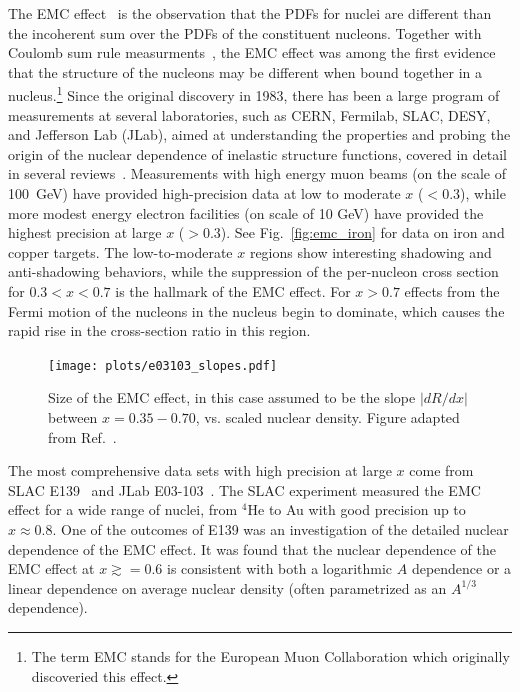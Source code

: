 The EMC effect~\cite{Aubert:1983xm} is the observation that the PDFs for nuclei are different than the incoherent sum over the PDFs of the constituent nucleons. Together with Coulomb sum rule measurments~\cite{Altemus:1980wt,Noble:1980my,Meziani:1984is,Morgenstern:2001jt,Cloet:2015tha}, the EMC effect was among the first evidence that the structure of the nucleons may be different when bound together in a nucleus.\footnote{The term EMC stands for the European Muon Collaboration which originally discoveried this effect.} Since the original discovery in 1983, there has been a large program of measurements at several laboratories, such as CERN, Fermilab, SLAC, DESY, and Jefferson Lab (JLab), aimed at understanding the properties and probing the origin of the nuclear dependence of inelastic structure functions, covered in detail in several reviews~\cite{Frankfurt:1988nt,Arneodo:1992wf,Geesaman:1995yd,Piller:1999wx,Sargsian:2002wc,Malace:2014uea,Hen:2016kwk}. Measurements with high energy muon beams (on the scale of 100~GeV) have provided high-precision data at low to moderate $x$ ($<0.3$), while more modest energy electron facilities (on scale of 10 GeV) have provided the highest precision at large $x$ ($>0.3$). See  Fig.~\ref{fig:emc_iron} for data on iron and copper targets.  The low-to-moderate $x$ regions show interesting shadowing and anti-shadowing behaviors, while the suppression of the per-nucleon cross section for $0.3<x<0.7$ is the hallmark of the EMC effect. For $x > 0.7$ effects from the Fermi motion of the nucleons in the nucleus begin to dominate, which causes the rapid rise in the cross-section ratio in this region.

\begin{figure}[tbp]
\centering\texttt{[image: plots/e03103\_slopes.pdf]}
\caption{Size of the EMC effect, in this case assumed to be the slope $|dR/dx|$ between $x=0.35-0.70$, vs. scaled nuclear density. Figure adapted from Ref.~\cite{Seely:2009gt}.}
\label{fig:emc_jlab_hallc}
\end{figure}

The most comprehensive data sets with high precision at large $x$ come from SLAC E139~\cite{Gomez:1993ri} and JLab E03-103~\cite{Seely:2009gt}. The SLAC experiment
measured the EMC effect for a wide range of nuclei, from $^4$He to Au with good precision up to
$x\approx0.8$.  One of the outcomes of E139 was an investigation of the detailed nuclear dependence of the EMC
effect. It was found that the nuclear dependence of the EMC effect at $x \gtrsim =0.6$ is consistent
with both a logarithmic $A$ dependence or a linear dependence on average nuclear density (often parametrized as an $A^{1/3}$ dependence).

